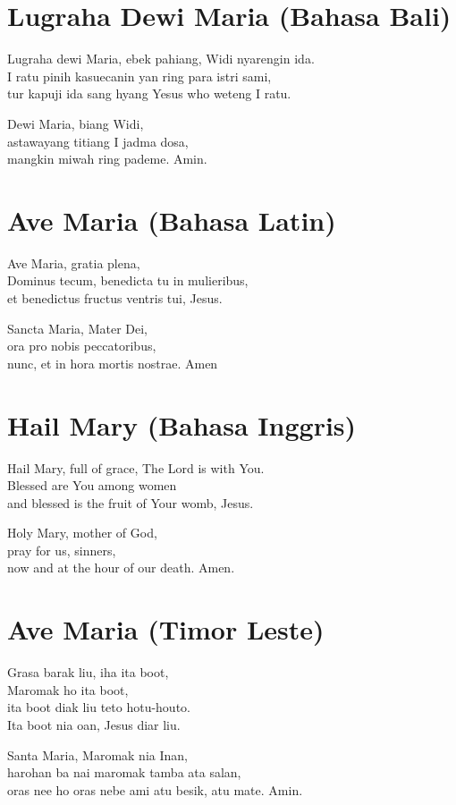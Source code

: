 \section*{Lugraha Dewi Maria (Bahasa Bali)}
Lugraha dewi Maria, ebek pahiang, Widi nyarengin ida.\\
I ratu pinih kasuecanin yan ring para istri sami,\\
tur kapuji ida sang hyang Yesus who weteng I ratu.

Dewi Maria, biang Widi, \\
astawayang titiang I jadma dosa,\\
mangkin miwah ring pademe. Amin.

\section*{Ave Maria (Bahasa Latin)}
Ave Maria, gratia plena,\\
Dominus tecum, benedicta tu in mulieribus,\\
et benedictus fructus ventris tui, Jesus.

Sancta Maria, Mater Dei,\\
ora pro nobis peccatoribus, \\
nunc, et in hora mortis nostrae. Amen


\section*{Hail Mary (Bahasa Inggris)}
Hail Mary, full of grace, The Lord is with You.\\
Blessed are You among women\\
and blessed is the fruit of Your womb, Jesus.

Holy Mary, mother of God,\\
pray for us, sinners,\\
now and at the hour of our death. Amen.

\section*{Ave Maria (Timor Leste)}
Grasa barak liu, iha ita boot, \\
Maromak ho ita boot, \\
ita boot diak liu teto hotu-houto. \\
Ita boot nia oan, Jesus diar liu.

Santa Maria, Maromak nia Inan, \\
harohan ba nai maromak tamba ata salan,\\
oras nee ho oras nebe ami atu besik, atu mate. Amin.


\setlength{\parskip}{0pt}
\setlength{\parindent}{15pt}

\normalsize